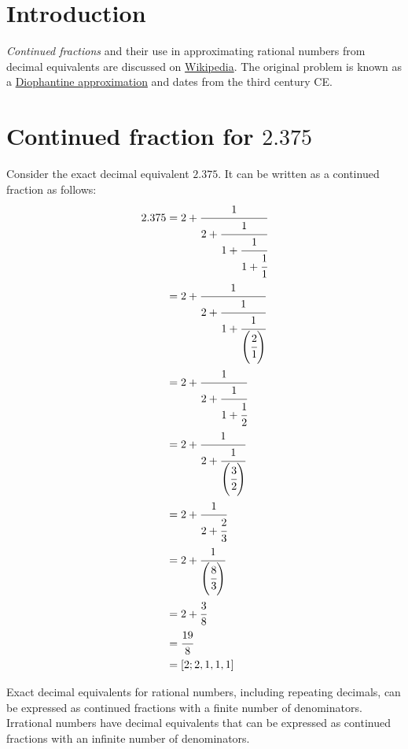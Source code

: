 \documentclass[11pt]{article}%
\begin{document}
\setlength{\baselineskip}{1.2\baselineskip}%



\section{Introduction}
\label{Introduction}

{\em Continued fractions } and their use in approximating rational numbers from decimal equivalents are discussed on \href{http://en.wikipedia.org/wiki/Continued_fraction#Best_rational_approximations}{Wikipedia}. The original problem is known as a \href{https://en.wikipedia.org/wiki/Diophantine_approximation}{Diophantine approximation} and dates from the third century CE.

\section{Continued fraction for \(2.375\)}
\label{ContinuedRational}

Consider the exact decimal equivalent \(2.375\). It can be written as a continued fraction as follows:
\begin{align}
2.375 &= 2 + \cfrac{1}{2 + \cfrac{1}{1 + \cfrac{1}{1 + \cfrac{1}{1}}}} \\
 &= 2 + \cfrac{1}{2 + \cfrac{1}{1 + \cfrac{1}{\left(\cfrac{2}{1}\right)}}} \\
 &= 2 + \cfrac{1}{2 + \cfrac{1}{1 + \cfrac{1}{2}}} \\
 &= 2 + \cfrac{1}{2 + \cfrac{1}{\left(\cfrac{3}{2}\right)}} \\
 &= 2 + \cfrac{1}{2 + \cfrac{2}{3}} \\
 &= 2 + \cfrac{1}{\left(\cfrac{8}{3}\right)} \\
 &= 2 + \cfrac{3}{8} \\
 &=\cfrac{19}{8} \\
 &= [2; 2, 1, 1, 1]
\end{align}

Exact decimal equivalents for rational numbers, including repeating decimals, can be expressed as continued fractions with a finite number of denominators. Irrational numbers have decimal equivalents that can be expressed as continued fractions with an infinite number of denominators.
\end{document}
